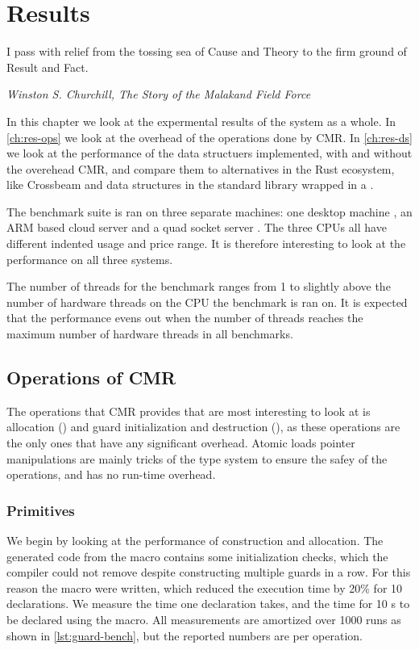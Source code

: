 \chapter{Results\label{ch:results}}

\epigraph{I pass with relief from the tossing sea of Cause and Theory to the firm ground of Result
and Fact.} {\textit{Winston S. Churchill, The Story of the Malakand Field Force}}



In this chapter we look at the expermental results of the system as a whole. In \cref{ch:res-ops}
we look at the overhead of the operations done by CMR. In \cref{ch:res-ds} we look at the
performance of the data structuers implemented, with and without the overehead CMR, and compare
them to alternatives in the Rust ecosystem, like Crossbeam\cite{crossbeam} and data structures in
the standard library wrapped in a .


The benchmark suite is ran on three separate machines: one desktop machine \gribb{}, an ARM based
cloud server \scaleway{} and a quad socket server \daslab{}.
The three CPUs all have different indented usage and price range. It is therefore interesting to
look at the performance on all three systems.


The number of threads for the benchmark ranges from 1 to slightly above the number of hardware
threads on the CPU the benchmark is ran on. It is expected that the performance evens out when the
number of threads reaches the maximum number of hardware threads in all benchmarks.


\clearpage

\section{Operations of CMR\label{ch:res-ops}}

The operations that CMR provides that are most interesting to look at is allocation
() and guard initialization and destruction (), as these operations
are the only ones that have any significant overhead. Atomic loads pointer manipulations are mainly
tricks of the type system to ensure the safey of the operations, and has no run-time overhead.


\subsection{Primitives}

We begin by looking at the performance of  construction and allocation.  The generated
code from the  macro contains some initialization checks, which the compiler could not
remove despite constructing multiple guards in a row. For this reason the  macro were
written, which reduced the execution time by 20\% for 10 declarations.  We measure the time one
 declaration takes, and the time for 10 s to be declared using the
 macro.  All measurements are amortized over 1000 runs as shown in
\cref{lst:guard-bench}, but the reported numbers are per operation.

